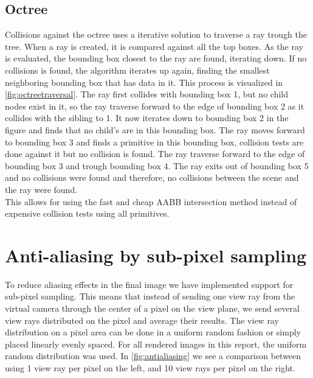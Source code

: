 \documentclass[a4paper, 12pt]{report}
\begin{document}
\subsection{Octree}
Collisions against the octree uses a iterative solution to traverse a ray trough the tree.
When a ray is created, it is compared against all the top boxes.
As the ray is evaluated, the bounding box closest to the ray are found, iterating down.
If no collisions is found, the algorithm iterates up again, finding the smallest neighboring bounding box that has data in it. This process is visualized in \autoref{fig:octreetraversal}. 
The ray first collides with bounding box 1, but no child nodes exist in it, so the ray traverse forward to the edge of bounding box 2 as it collides with the sibling to 1. 
It now iterates down to bounding box 2 in the figure and finds that no child's are in this bounding box. 
The ray moves forward to bounding box 3 and finds a primitive in this bounding box, collision tests are done against it but no collision is found.
The ray traverse forward to the edge of bounding box 3 and trough bounding box 4.
The ray exits out of bounding box 5 and no collisions were found and therefore, no collisions between the scene and the ray were found.\\

This allows for using the fast and cheap AABB intersection method instead of expensive collision tests using all primitives.

\section{Anti-aliasing by sub-pixel sampling}
To reduce aliasing effects in the final image we have implemented support for sub-pixel sampling.
This means that instead of sending one view ray from the virtual camera through the center of a pixel on the view plane, we send several view rays distributed on the pixel and average their results.
The view ray distribution on a pixel area can be done in a uniform random fashion or simply placed linearly evenly spaced.
For all rendered images in this report, the uniform random distribution was used.
In  \autoref{fig:antialiasing} we see a comparison between using 1 view ray per pixel on the left, and 10 view rays per pixel on the right.
\end{document}
